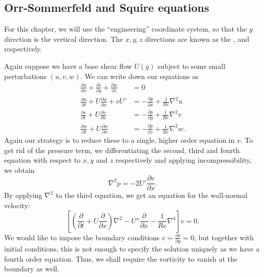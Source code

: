 \documentclass[a4paper]{article}
\begin{document}
\subsection{Orr-Sommerfeld and Squire equations}
For this chapter, we will use the ``engineering'' coordinate system, so that the $y$ direction is the vertical direction. The $x, y, z$ directions are known as the ,  and  respectively.
\begin{center}
\end{center}
Again suppose we have a base shear flow $U(y)$ subject to some small perturbations $(u, v, w)$. We can write down our equations as
\begin{align*}
  \frac{\partial u}{\partial x} + \frac{\partial v}{\partial y} + \frac{\partial w}{\partial z} &= 0\\
  \frac{\partial u}{\partial t} + U \frac{\partial u}{\partial x} + v U' &= - \frac{\partial p}{\partial x} + \frac{1}{Re}\nabla^2 u\\
  \frac{\partial v}{\partial t} + U \frac{\partial v}{\partial x} &= - \frac{\partial p}{\partial y} + \frac{1}{Re} \nabla^2 v\\
  \frac{\partial w}{\partial t} + U \frac{\partial w}{\partial x} &= - \frac{\partial p}{\partial z} + \frac{1}{Re} \nabla^2 w.
\end{align*}
Again our strategy is to reduce these to a single, higher order equation in $v$. To get rid of the pressure term, we differentiating the second, third and fourth equation with respect to $x, y$ and $z$ respectively and applying incompressibility, we obtain
\[
  \nabla^2 p = -2U' \frac{\partial v}{\partial x}.
\]
By applying $\nabla^2$ to the third equation, we get an equation for the wall-normal velocity:
\[
  \left[ \left(\frac{\partial}{\partial t} + U \frac{\partial}{\partial x}\right)\nabla^2 - U'' \frac{\partial}{\partial x} - \frac{1}{Re}\nabla^4\right] v = 0.
\]
We would like to impose the boundary conditions $v = \frac{\partial v}{\partial y} = 0$, but together with initial conditions, this is not enough to specify the solution uniquely as we have a fourth order equation. Thus, we shall require the vorticity to vanish at the boundary as well.
\end{document}
